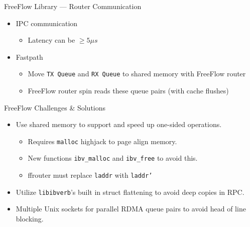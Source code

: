 \documentclass{beamer}
\begin{document}
\begin{frame}{FreeFlow Library --- Router Communication}
    \begin{itemize}
        \item IPC communication
            \begin{itemize}
                \item Latency can be $\geq 5\mu s$
            \end{itemize}
        \item Fastpath
            \begin{itemize}
                \item Move \texttt{TX Queue} and \texttt{RX Queue} to shared memory with FreeFlow router
                \item FreeFlow router spin reads these queue pairs (with cache flushes)
            \end{itemize}
    \end{itemize}
\end{frame}

\begin{frame}{FreeFlow Challenges \& Solutions}
    \begin{itemize}
        \item Use shared memory to support and speed up one-sided operations.
            \begin{itemize}
                \item Requires \texttt{malloc} highjack to page align memory.
                \item New functions \texttt{ibv\_malloc} and \texttt{ibv\_free} to avoid this.
                \item ffrouter must replace \texttt{laddr} with \texttt{laddr'}
            \end{itemize}
        \item Utilize \texttt{libibverb}'s built in struct flattening to avoid deep copies in RPC.
        \item Multiple Unix sockets for parallel RDMA queue pairs to avoid head of line blocking.
    \end{itemize}
\end{frame}
\end{document}
